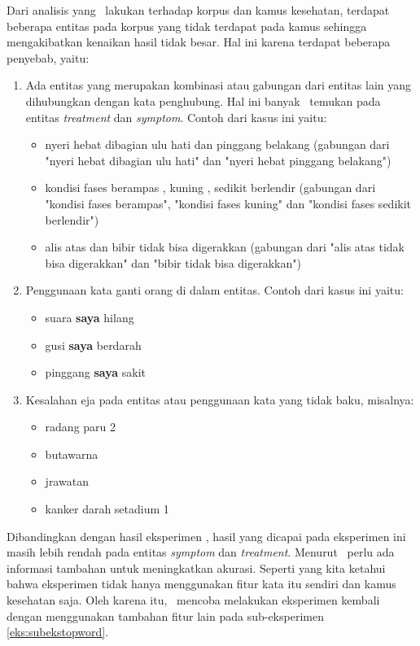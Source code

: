 	Dari analisis yang \saya~lakukan terhadap korpus dan kamus kesehatan, terdapat beberapa entitas pada korpus yang tidak terdapat pada kamus sehingga mengakibatkan kenaikan hasil tidak besar. Hal ini karena terdapat beberapa penyebab, yaitu:
	\begin{enumerate}
		\item Ada entitas yang merupakan kombinasi atau gabungan dari entitas lain yang dihubungkan dengan kata penghubung. Hal ini banyak \saya~temukan pada entitas \textit{treatment} dan \textit{symptom}. Contoh dari kasus ini yaitu:
		\begin{itemize}
			\item nyeri hebat dibagian ulu hati dan pinggang belakang (gabungan dari "nyeri hebat dibagian ulu hati" dan "nyeri hebat pinggang belakang")
			\item kondisi fases berampas , kuning , sedikit berlendir (gabungan dari "kondisi fases berampas", "kondisi fases kuning" dan "kondisi fases sedikit berlendir")
			\item alis atas dan bibir tidak bisa digerakkan (gabungan dari "alis atas tidak bisa digerakkan" dan "bibir tidak bisa digerakkan")
		\end{itemize}
		
		\item Penggunaan kata ganti orang di dalam entitas. Contoh dari kasus ini yaitu:
		\begin{itemize}
			\item suara \textbf{saya} hilang
			\item gusi \textbf{saya} berdarah
			\item pinggang \textbf{saya} sakit
		\end{itemize}
		
		\item Kesalahan eja pada entitas atau penggunaan kata yang tidak baku, misalnya:
		\begin{itemize}
			\item radang paru 2
			\item butawarna
			\item jrawatan
			\item kanker darah setadium 1
		\end{itemize}
	\end{enumerate}

	Dibandingkan dengan hasil eksperimen \cite{skripsiKakRadit}, hasil yang dicapai pada eksperimen ini masih lebih rendah pada entitas \textit{symptom} dan \textit{treatment}. Menurut \saya~perlu ada informasi tambahan untuk meningkatkan akurasi. Seperti yang kita ketahui bahwa eksperimen \cite{skripsiKakRadit} tidak hanya menggunakan fitur kata itu sendiri dan kamus kesehatan saja. Oleh karena itu, \saya~mencoba melakukan eksperimen kembali dengan menggunakan tambahan fitur lain pada sub-eksperimen \ref{eks:subekstopword}.
	

